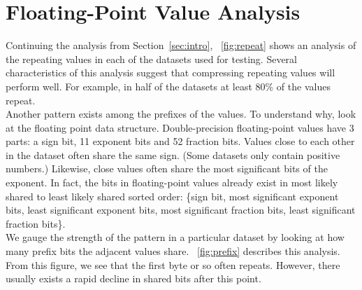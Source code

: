 \section{Floating-Point Value Analysis}
\label{sec:analysis}
Continuing the analysis from Section~\ref{sec:intro}, \figurename~\ref{fig:repeat} shows an analysis of the repeating values in each of the datasets used for testing. Several characteristics of this analysis suggest that compressing repeating values will perform well. For example, in half of the datasets at least 80\% of the values repeat.\\
\indent
Another pattern exists among the prefixes of the values. To understand why, look at the floating point data structure. Double-precision floating-point values have 3 parts: a sign bit, 11 exponent bits and 52 fraction bits. Values close to each other in the dataset often share the same sign. (Some datasets only contain positive numbers.) Likewise, close values often share the most significant bits of the exponent. In fact, the bits in floating-point values already exist in most likely shared to least likely shared sorted order: \{sign bit, most significant exponent bits, least significant exponent bits, most significant fraction bits, least significant fraction bits\}.\\
\indent We gauge the strength of the pattern in a particular dataset by looking at how many prefix bits the adjacent values share. \figurename~\ref{fig:prefix} describes this analysis. From this figure, we see that the first byte or so often repeats. However, there usually exists a rapid decline in shared bits after this point.\par
